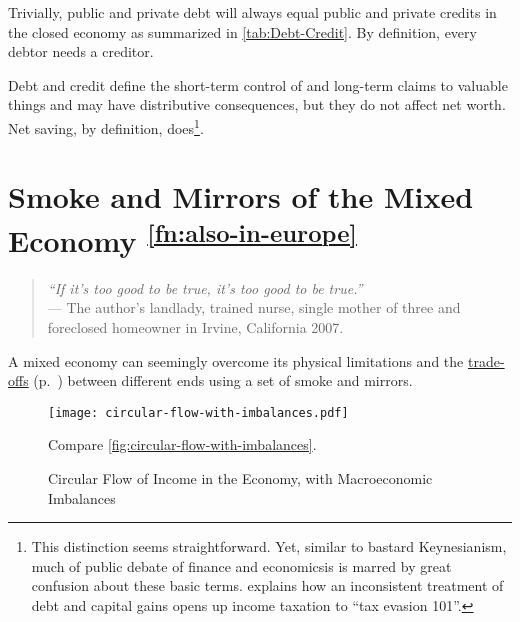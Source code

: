 \begin{enumerate}
	Trivially, public and private debt will always equal public and private credits in the closed economy as summarized in \autoref{tab:Debt-Credit}. By definition, every debtor needs a creditor. 
	
	Debt and credit define the short-term control of and long-term claims to valuable things and may have distributive consequences, but they do not affect net worth. Net saving, by definition, does\footnote{
		This distinction seems straightforward. Yet, similar to bastard Keynesianism, much of public debate of finance and economicsis is marred by great confusion about these basic terms. \citealt{McCaffery2005} explains how an inconsistent treatment of debt and capital gains opens up income taxation to ``tax evasion 101''.}.%
\end{enumerate}

\section[Smoke \& Mirrors]{Smoke and Mirrors of the Mixed Economy \textsuperscript{\ref{fn:also-in-europe}}} \label{sec:smoke-n-mirrors}

\begin{quote}
	\emph{``If it's too good to be true, it's too good to be true.''\\}
	--- The author's landlady, trained nurse, single mother of three and foreclosed homeowner in Irvine, California 2007.
\end{quote}


A mixed economy can seemingly overcome its physical limitations and the \hyperref[sec:trade-offs]{trade-offs} (p.~\pageref{sec:trade-offs}) between different ends using a set of smoke and mirrors. 

\begin{figure}[htbp]
	\centering
	\texttt{[image: circular-flow-with-imbalances.pdf]}  
	\caption[Circular Flow in the Economy, with Imbalances]{Circular Flow of Income in the Economy, with Macroeconomic Imbalances}
	\begin{flushleft}
		\scriptsize{Compare \autoref{fig:circular-flow-with-imbalances}.}
	\end{flushleft}
	\label{fig:circular-flow-with-imbalances}
\end{figure}


